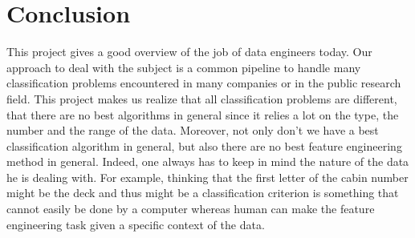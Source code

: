 \documentclass[11pt,a4paper,portrait]{article}
\begin{document}
\part*{Conclusion}
This project gives a good overview of the job of data engineers today. Our approach to deal with the subject is a common pipeline to handle many classification problems encountered in many companies or in the public research field. This project makes us realize that all classification problems are different, that there are no best algorithms in general since it relies a lot on the type, the number and the range of the data. Moreover, not only don't we have a best classification algorithm in general, but also there are no best feature engineering method in general. Indeed, one always has to keep in mind the nature of the data he is dealing with. For example, thinking that the first letter of the cabin number might be the deck and thus might be a classification criterion is something that cannot easily be done by a computer whereas human can make the feature engineering task given a specific context of the data.
\end{document}

